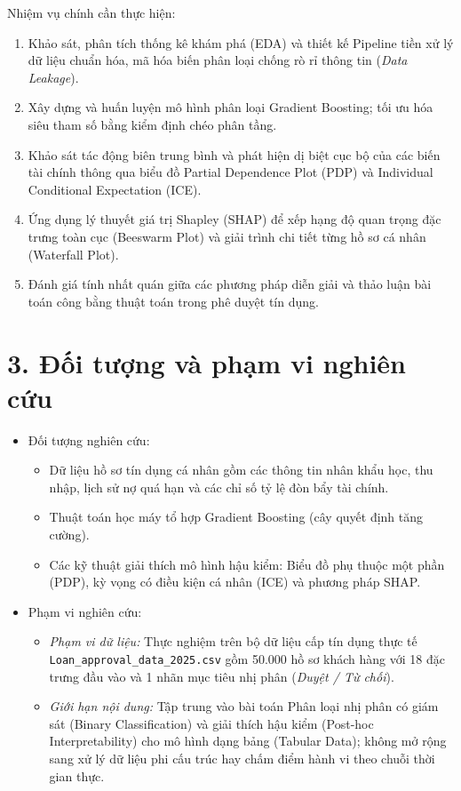 \documentclass[12pt,a4paper,oneside]{report}
\begin{document}
{Nhiệm vụ chính cần thực hiện:}
\begin{enumerate}
    \item Khảo sát, phân tích thống kê khám phá (EDA) và thiết kế Pipeline tiền xử lý dữ liệu chuẩn hóa, mã hóa biến phân loại chống rò rỉ thông tin (\textit{Data Leakage}).
    \item Xây dựng và huấn luyện mô hình phân loại Gradient Boosting; tối ưu hóa siêu tham số bằng kiểm định chéo phân tầng.
    \item Khảo sát tác động biên trung bình và phát hiện dị biệt cục bộ của các biến tài chính thông qua biểu đồ Partial Dependence Plot (PDP) và Individual Conditional Expectation (ICE).
    \item Ứng dụng lý thuyết giá trị Shapley (SHAP) để xếp hạng độ quan trọng đặc trưng toàn cục (Beeswarm Plot) và giải trình chi tiết từng hồ sơ cá nhân (Waterfall Plot).
    \item Đánh giá tính nhất quán giữa các phương pháp diễn giải và thảo luận bài toán công bằng thuật toán trong phê duyệt tín dụng.
\end{enumerate}

\section*{3. Đối tượng và phạm vi nghiên cứu}
\begin{itemize}
    \item {Đối tượng nghiên cứu:} 
    \begin{itemize}
        \item Dữ liệu hồ sơ tín dụng cá nhân gồm các thông tin nhân khẩu học, thu nhập, lịch sử nợ quá hạn và các chỉ số tỷ lệ đòn bẩy tài chính.
        \item Thuật toán học máy tổ hợp Gradient Boosting (cây quyết định tăng cường).
        \item Các kỹ thuật giải thích mô hình hậu kiểm: Biểu đồ phụ thuộc một phần (PDP), kỳ vọng có điều kiện cá nhân (ICE) và phương pháp SHAP.
    \end{itemize}
    \item {Phạm vi nghiên cứu:}
    \begin{itemize}
        \item \textit{Phạm vi dữ liệu:} Thực nghiệm trên bộ dữ liệu cấp tín dụng thực tế \texttt{Loan\_approval\_data\_2025.csv} gồm 50.000 hồ sơ khách hàng với 18 đặc trưng đầu vào và 1 nhãn mục tiêu nhị phân (\textit{Duyệt / Từ chối}).
        \item \textit{Giới hạn nội dung:} Tập trung vào bài toán Phân loại nhị phân có giám sát (Binary Classification) và giải thích hậu kiểm (Post-hoc Interpretability) cho mô hình dạng bảng (Tabular Data); không mở rộng sang xử lý dữ liệu phi cấu trúc hay chấm điểm hành vi theo chuỗi thời gian thực.
    \end{itemize}
\end{itemize}
\end{document}
